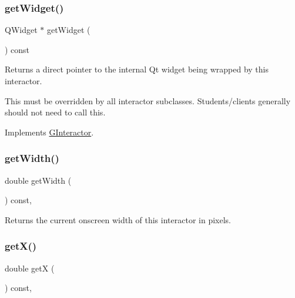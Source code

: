 \mbox{\label{classGBrowserPane_a326ee51b5561f807df7b29a1c101f7fd}} 
\subsubsection{\texorpdfstring{get\+Widget()}{getWidget()}}
{\footnotesize\ttfamily Q\+Widget $\ast$ get\+Widget (\begin{DoxyParamCaption}{ }\end{DoxyParamCaption}) const\hspace{0.3cm}{\ttfamily [virtual]}}



Returns a direct pointer to the internal Qt widget being wrapped by this interactor. 

This must be overridden by all interactor subclasses. Students/clients generally should not need to call this. 

Implements \mbox{\hyperlink{classGInteractor}{G\+Interactor}}.

\mbox{\label{classGInteractor_a0ed2965abd4f5701d2cadf71239faf19}} 
\subsubsection{\texorpdfstring{get\+Width()}{getWidth()}}
{\footnotesize\ttfamily double get\+Width (\begin{DoxyParamCaption}{ }\end{DoxyParamCaption}) const\hspace{0.3cm}{\ttfamily [virtual]}, {\ttfamily [inherited]}}



Returns the current onscreen width of this interactor in pixels. 

\mbox{\label{classGInteractor_a344385751bee0720059403940d57a13e}} 
\subsubsection{\texorpdfstring{get\+X()}{getX()}}
{\footnotesize\ttfamily double getX (\begin{DoxyParamCaption}{ }\end{DoxyParamCaption}) const\hspace{0.3cm}{\ttfamily [virtual]}, {\ttfamily [inherited]}}



